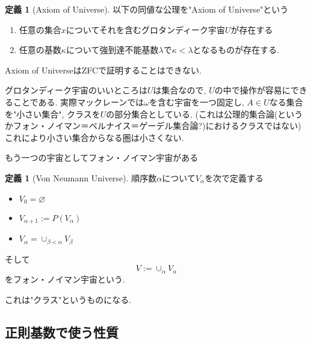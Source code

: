 \documentclass[dvipdfmx,a4paper,11pt]{article}
\theoremstyle{definition}
\newtheorem{dfn}[thm]{定義}
\newtheorem{rem}[thm]{注意}
\begin{document}
 \begin{tcolorbox}
 [colback = white, colframe = green!35!black, fonttitle = \bfseries,breakable = true]
\begin{dfn}[Axiom of Universe]
以下の同値な公理を"Axiom of Universe"という
\begin{enumerate}
\item 任意の集合$x$についてそれを含むグロタンディーク宇宙$U$が存在する
\item 任意の基数$\kappa$について強到達不能基数$\lambda$で$\kappa < \lambda$となるものが存在する. 
\end{enumerate}
\end{dfn}
\end{tcolorbox}
Axiom of UniverseはZFCで証明することはできない.

グロタンディーク宇宙のいいところは$U$は集合なので, $U$の中で操作が容易にできることである.
実際マックレーンでは$\omega$を含む宇宙を一つ固定し, $A \in U$なる集合を"小さい集合", クラスを$U$の部分集合としている. (これは公理的集合論(というかフォン・ノイマン＝ベルナイス＝ゲーデル集合論?)におけるクラスではない)
これにより小さい集合からなる圏は小さくない. 

もう一つの宇宙としてフォン・ノイマン宇宙がある
 \begin{tcolorbox}
 [colback = white, colframe = green!35!black, fonttitle = \bfseries,breakable = true]
\begin{dfn}[Von Neumann Universe]
順序数$\alpha$について$V_{\alpha}$を次で定義する
\begin{itemize}
\item $V_{0} = \varnothing$ 
\item $V_{\alpha+1}:=P(V_{\alpha})$
\item $V_{\alpha}= \cup_{\beta < \alpha} V_{\beta}$
\end{itemize}
そして
$$
V := \cup_{\alpha} V_{\alpha}
$$
をフォン・ノイマン宇宙という.
\end{dfn}
\end{tcolorbox}
これは"クラス"というものになる. 


\subsection{正則基数で使う性質}
\end{document}
